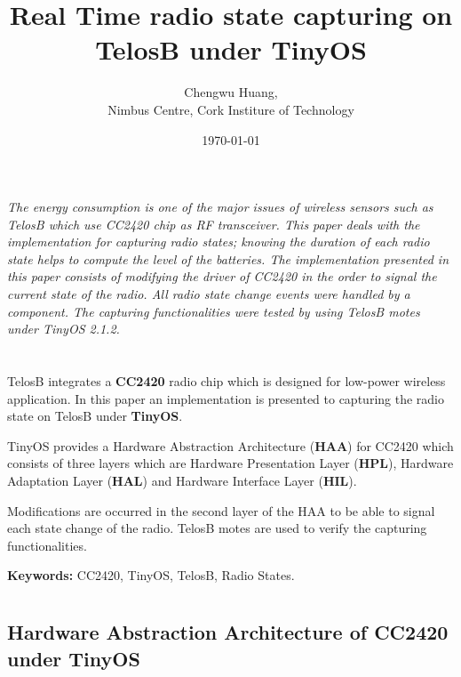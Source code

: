 \documentclass[a4paper,11pt]{article}
\title{Real Time radio state capturing on TelosB under TinyOS}
\author{Chengwu Huang, \\ Nimbus Centre, Cork Institure of Technology}
\date{\today}
\begin{document}
\maketitle
\tableofcontents

\newpage

\section*{}

\textit{The energy consumption is one of the major issues of wireless sensors such as TelosB which use CC2420 chip as RF transceiver. This paper deals with the implementation for capturing radio states; knowing the duration of each radio state helps to compute the level of the batteries. The implementation presented in this paper consists of modifying the driver of CC2420 in the order to signal the current state of the radio. All radio state change events were handled by a component. The capturing functionalities were tested by using TelosB motes under TinyOS 2.1.2.}

\section{}

TelosB integrates a \textbf{CC2420} radio chip which is designed for low-power wireless application. In this paper an implementation is presented to capturing the radio state on TelosB under \textbf{TinyOS}.

TinyOS provides a Hardware Abstraction Architecture (\textbf{HAA}) for CC2420 which consists of three layers which are Hardware Presentation Layer (\textbf{HPL}), Hardware Adaptation Layer (\textbf{HAL}) and Hardware Interface Layer (\textbf{HIL}).

Modifications are occurred in the second layer of the HAA to be able to signal each state change of the radio. TelosB motes are used to verify the capturing functionalities.

\textbf{Keywords:} CC2420, TinyOS, TelosB, Radio States.

\section{}

  \subsection{Hardware Abstraction Architecture of CC2420 under TinyOS}
\end{document}
